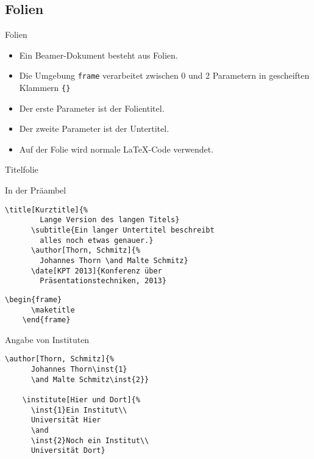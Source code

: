 
\subsection{Folien}

\begin{Frame}[fragile]{Folien}
  \begin{itemize}
    \item Ein Beamer-Dokument besteht aus Folien.
    \item Die Umgebung \lstinline-frame- verarbeitet
      zwischen 0 und 2 Parametern in gescheiften Klammern \lstinline-{}-
    \item Der erste Parameter ist der Folientitel.
    \item Der zweite Parameter ist der Untertitel.
    \item Auf der Folie wird normale \LaTeX-Code verwendet.
  \end{itemize}
\end{Frame}

\begin{Frame}[fragile]{Titelfolie}
  \begin{Block}{In der Präambel}
    \begin{lstlisting}[gobble=6,style=block]
      \title[Kurztitle]{%
        Lange Version des langen Titels}
      \subtitle{Ein langer Untertitel beschreibt
        alles noch etwas genauer.}
      \author[Thorn, Schmitz]{%
        Johannes Thorn \and Malte Schmitz}
      \date[KPT 2013]{Konferenz über
        Präsentationstechniken, 2013}
    \end{lstlisting}
  \end{Block}

  \begin{lstlisting}[gobble=4]
    \begin{frame}
      \maketitle
    \end{frame}
  \end{lstlisting}
\end{Frame}

\begin{Frame}[fragile]{Angabe von Instituten}
  \begin{lstlisting}[gobble=4]
    \author[Thorn, Schmitz]{%
      Johannes Thorn\inst{1}
      \and Malte Schmitz\inst{2}}

    \institute[Hier und Dort]{%
      \inst{1}Ein Institut\\
      Universität Hier
      \and
      \inst{2}Noch ein Institut\\
      Universität Dort}
  \end{lstlisting}
\end{Frame}

